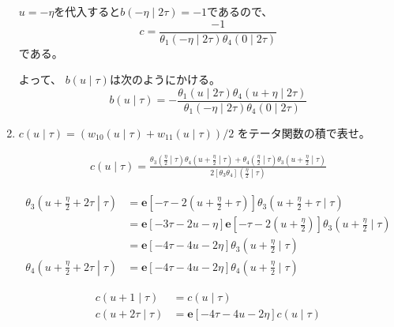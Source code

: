 \documentclass[12pt,b5paper]{ltjsarticle}
\begin{document}
\begin{enumerate}
         $u=-\eta$を代入すると$b(-\eta\mid2\tau)=-1$であるので、
         \begin{equation}
          c=\frac{-1}{\theta_{1}(-\eta \mid 2\tau) \theta_{4}(0 \mid 2\tau)}
         \end{equation}
         である。

         よって、
         $b(u\mid\tau)$は次のようにかける。
         \begin{equation}
          b(u\mid\tau)=
           -\frac{ \theta_{1}(u \mid 2\tau) \theta_{4}(u+\eta \mid 2\tau) }{\theta_{1}(-\eta \mid 2\tau) \theta_{4}(0 \mid 2\tau)}
         \end{equation}
         





    \hrulefill

    \item
    $c(u\mid \tau) = ( w_{10}(u\mid \tau) + w_{11}(u\mid \tau) )/2$
    をテータ関数の積で表せ。

    \dotfill

    \begin{align}
        c(u\mid \tau) = \frac{
        \theta_{3}\left( \frac{\eta}{2} \middle| \tau \right)
        \theta_{4}\left( u+\frac{\eta}{2} \middle| \tau \right)
        +\theta_{4}\left( \frac{\eta}{2} \middle| \tau \right)
        \theta_{3}\left( u+\frac{\eta}{2} \middle| \tau \right)
        }{
        2[\theta_{3}\theta_{4}]\left( \frac{\eta}{2} \middle| \tau \right)
        }
    \end{align}


         \begin{align}
          \theta_{3}\left( u+\frac{\eta}{2}+2\tau \middle| \tau \right)
          &= \mathbf{e}[-\tau-2(u+\frac{\eta}{2}+\tau)] \theta_{3}(u+\frac{\eta}{2}+\tau \mid \tau)\\
          &= \mathbf{e}[-3\tau-2u-\eta] \mathbf{e}[-\tau -2(u+\frac{\eta}{2})]\theta_{3}(u+\frac{\eta}{2} \mid\tau)\\
          &= \mathbf{e}[-4\tau -4u-2\eta]\theta_{3}(u+\frac{\eta}{2} \mid\tau)\\
          \theta_{4}\left( u+\frac{\eta}{2}+2\tau \middle| \tau \right)
          &= \mathbf{e}[-4\tau -4u-2\eta]\theta_{4}(u+\frac{\eta}{2} \mid\tau)
         \end{align}

         \begin{align}
          c(u+1 \mid \tau) &= c(u \mid \tau)\\
          c(u+2\tau \mid \tau) &=
          \mathbf{e}[-4\tau-4u-2\eta]c(u \mid \tau)
         \end{align}




\end{enumerate}
\end{document}

